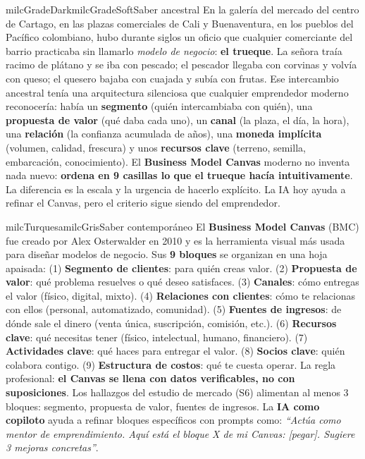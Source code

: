 \documentclass[11pt,letterpaper]{article}
\begin{document}
\begin{softbox}{milcGradeDark}{milcGradeSoft}{Saber ancestral}
En la galería del mercado del centro de Cartago, en las plazas comerciales de Cali y Buenaventura, en los pueblos del Pacífico colombiano, hubo durante siglos un oficio que cualquier comerciante del barrio practicaba sin llamarlo \emph{modelo de negocio}: \textbf{el trueque}. La señora traía racimo de plátano y se iba con pescado; el pescador llegaba con corvinas y volvía con queso; el quesero bajaba con cuajada y subía con frutas. Ese intercambio ancestral tenía una arquitectura silenciosa que cualquier emprendedor moderno reconocería: había un \textbf{segmento} (quién intercambiaba con quién), una \textbf{propuesta de valor} (qué daba cada uno), un \textbf{canal} (la plaza, el día, la hora), una \textbf{relación} (la confianza acumulada de años), una \textbf{moneda implícita} (volumen, calidad, frescura) y unos \textbf{recursos clave} (terreno, semilla, embarcación, conocimiento). El \textbf{Business Model Canvas} moderno no inventa nada nuevo: \textbf{ordena en 9 casillas lo que el trueque hacía intuitivamente}. La diferencia es la escala y la urgencia de hacerlo explícito. La IA hoy ayuda a refinar el Canvas, pero el criterio sigue siendo del emprendedor.
\end{softbox}

\begin{softbox}{milcTurquesa}{milcGris}{Saber contemporáneo}
El \textbf{Business Model Canvas} (BMC) fue creado por Alex Osterwalder en 2010 y es la herramienta visual más usada para diseñar modelos de negocio. Sus \textbf{9 bloques} se organizan en una hoja apaisada: (1) \textbf{Segmento de clientes}: para quién creas valor. (2) \textbf{Propuesta de valor}: qué problema resuelves o qué deseo satisfaces. (3) \textbf{Canales}: cómo entregas el valor (físico, digital, mixto). (4) \textbf{Relaciones con clientes}: cómo te relacionas con ellos (personal, automatizado, comunidad). (5) \textbf{Fuentes de ingresos}: de dónde sale el dinero (venta única, suscripción, comisión, etc.). (6) \textbf{Recursos clave}: qué necesitas tener (físico, intelectual, humano, financiero). (7) \textbf{Actividades clave}: qué haces para entregar el valor. (8) \textbf{Socios clave}: quién colabora contigo. (9) \textbf{Estructura de costos}: qué te cuesta operar. La regla profesional: \textbf{el Canvas se llena con datos verificables, no con suposiciones}. Los hallazgos del estudio de mercado (S6) alimentan al menos 3 bloques: segmento, propuesta de valor, fuentes de ingresos. La \textbf{IA como copiloto} ayuda a refinar bloques específicos con prompts como: \emph{``Actúa como mentor de emprendimiento. Aquí está el bloque X de mi Canvas: [pegar]. Sugiere 3 mejoras concretas''}.
\end{softbox}
\end{document}
